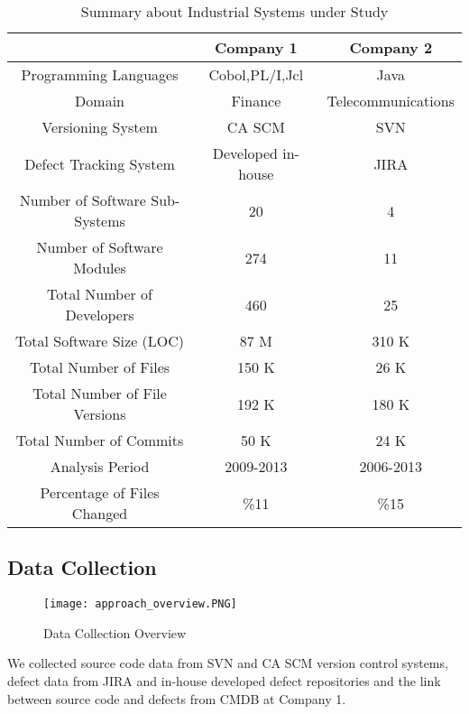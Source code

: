 \documentclass[times]{smrauth}
\begin{document}
\begin{table}[!h]
\caption{Summary about Industrial Systems under Study} 
\label {systeminfo1} 
\begin{center}
\begin{tabular}{ |c|c|c| }
  \hline
  & Company 1 & Company 2 \\
  \hline
  Programming Languages & Cobol,PL/I,Jcl & Java \\
  Domain & Finance & Telecommunications \\
  Versioning System & CA SCM & SVN \\
  Defect Tracking System & Developed in-house & JIRA \\
  Number of Software Sub-Systems & 20 & 4 \\
  Number of Software Modules & 274 & 11 \\
  Total Number of Developers & 460 & 25 \\
  Total Software Size (LOC) & 87 M & 310 K \\
  Total Number of Files & 150 K & 26 K \\
  Total Number of File Versions & 192 K & 180 K \\
  Total Number of Commits & 50 K & 24 K \\
  Analysis Period & 2009-2013 & 2006-2013 \\
  Percentage of Files Changed & \%11 & \%15 \\
  \hline
\end{tabular}
\end{center}
\end{table}

\subsection{Data Collection}

\begin{figure*}[!t]
\centering
\texttt{[image: approach\_overview.PNG]}
\caption{Data Collection Overview}
\label{data_overview}	
\end{figure*}

We collected source code data from SVN and CA SCM version control systems, defect data from JIRA and in-house developed defect repositories and the link between source code and defects from CMDB at Company 1. 
\end{document}
